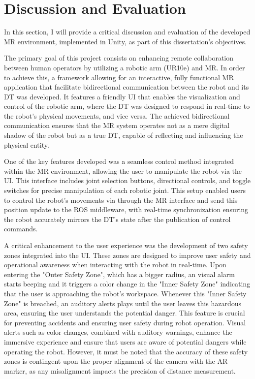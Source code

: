 \chapter{Discussion and Evaluation}

In this section, I will provide a critical discussion and evaluation of the developed \ac{MR} environment, implemented in Unity, as part of this dissertation's objectives.

The primary goal of this project consists on enhancing remote collaboration between human operators by utilizing a robotic arm (UR10e) and \ac{MR}. In order to achieve this, a framework allowing for an interactive, fully functional \ac{MR} application that facilitate bidirectional communication between the robot and its \ac{DT} was developed. It features a friendly \ac{UI} that enables the visualization and control of the robotic arm, where the \ac{DT} was designed to respond in real-time to the robot's physical movements, and vice versa. The achieved bidirectional communication ensures that the \ac{MR} system operates not as a mere digital shadow of the robot but as a true \ac{DT}, capable of reflecting and influencing the physical entity.

One of the key features developed was a seamless control method integrated within the \ac{MR} environment, allowing the user to manipulate the robot via the \ac{UI}. This interface includes joint selection buttons, directional controls, and toggle switches for precise manipulation of each robotic joint.  This setup enabled users to control the robot's movements via through the \ac{MR} interface and send this position update to the \ac{ROS} middleware, with real-time synchronization ensuring the robot accurately mirrors the \ac{DT}'s state after the publication of control commands.

A critical enhancement to the user experience was the development of two safety zones integrated into the \ac{UI}. These zones are designed to improve user safety and operational awareness when interacting with the robot in real-time. Upon entering the "Outer Safety Zone", which has a bigger radius, an visual alarm starts beeping and it triggers a color change in the "Inner Safety Zone" indicating that the user is approaching the robot's workspace. Whenever this "Inner Safety Zone" is breached, an auditory alerts plays until the user leaves this hazardous area, ensuring the user understands the potential danger. This feature is crucial for preventing accidents and ensuring user safety during robot operation.
Visual alerts such as color changes, combined with auditory warnings, enhance the immersive experience and ensure that users are aware of potential dangers while operating the robot. However, it must be noted that the accuracy of these safety zones is contingent upon the proper alignment of the camera with the \ac{AR} marker, as any misalignment impacts the precision of distance measurement.

